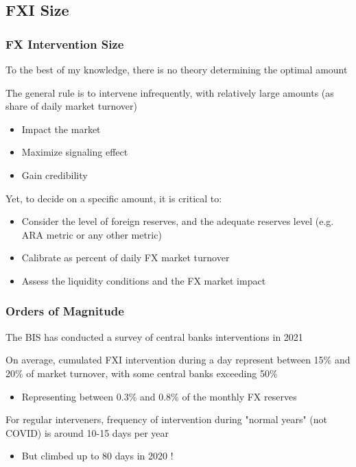 \documentclass{beamer}
\newenvironment{wideitemize}{\itemize\addtolength{\itemsep}{10pt}}{\enditemize}
\begin{document}
\subsection{FXI Size}

\begin{frame}
  \frametitle{FX Intervention Size}
  \begin{wideitemize}
  \item To the best of my knowledge, there is no theory determining the optimal amount
  \item The general rule is to intervene infrequently, with relatively large amounts (as share of daily market turnover)
    \begin{itemize}
    \item Impact the market
    \item Maximize signaling effect
    \item Gain credibility
    \end{itemize}
  \item Yet, to decide on a specific amount, it is critical to:
    \begin{itemize}
    \item Consider the level of foreign reserves, and the adequate reserves level (e.g. ARA metric or any other metric)
    \item Calibrate as percent of daily FX market turnover
    \item Assess the liquidity conditions and the FX market impact
    \end{itemize}
  \end{wideitemize}
\end{frame}


\begin{frame}
  \frametitle{Orders of Magnitude}
  \begin{wideitemize}
  \item The BIS has conducted a survey of central banks interventions in 2021 \href{https://www.bis.org/publ/mc_insights_fxinterventions.pdf}{}
  \item On average, cumulated FXI intervention during a day represent between 15\% and 20\% of market turnover, with some central banks exceeding 50\%
    \begin{itemize}
    \item Representing between 0.3\% and 0.8\% of the monthly FX reserves
    \end{itemize}
  \item For regular interveners, frequency of intervention during "normal years" (not COVID) is around 10-15 days per year
    \begin{itemize}
    \item But climbed up to 80 days in 2020 !
    \end{itemize}
  \end{wideitemize}
\end{frame}
\end{document}
